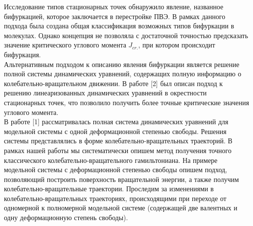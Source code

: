Исследование типов стационарных точек обнаружило явление, названное бифуркацией, которое заключается в перестройке ПВЭ. В рамках данного подхода была создана общая классификация возможных типов бифуркации в молекулах. Однако концепция не позволяла с достаточной точностью предсказать значение критического углового момента $J_{cr.}$, при котором происходит бифуркация. \\
Альтернативным подходом к описанию явления бифуркации является решение полной системы динамических уравнений, содержащих полную информацию о колебательно-вращательном движении. В работе [2] был описан подход к решению линеаризованных динамических уравнений в окрестности стационарных точек, что позволило получить более точные критические значения углового момента. \\
В работе [1] рассматривалась полная система динамических уравнений для модельной системы с одной деформационной степенью свободы. Решения системы представлялись в форме колебательно-вращательных траекторий. В рамках нашей работы мы систематически опишем метод получения точного классического колебательно-вращательного гамильтониана. На примере модельной системы с деформационной степенью свободы опишем подход, позволяющий построить поверхность вращательной энергии, а также получим колебательно-вращательные траектории. Проследим за изменениями в колебательно-вращательных траекториях, происходящими при переходе от одномерной к полномерной модельной системе (содержащей две валентных и одну деформационную степень свободы). 